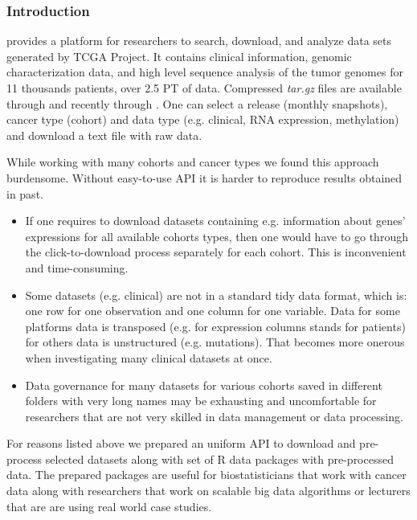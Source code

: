 \documentclass{bioinfo}
\begin{document}
\subsubsection*{Introduction}
\cite{TCGAP} provides a platform for researchers to search, download, and analyze data sets generated by TCGA Project. It contains clinical information, genomic characterization data, and high level sequence analysis of the tumor genomes for 11 thousands patients, over 2.5 PT of data. Compressed \textit{tar.gz} files are available through \cite{BroadGDAC} and recently through \cite{GDC}. One can select a release (monthly snapshots), cancer type (cohort) and data type (e.g. clinical, RNA expression, methylation) and download a text file with raw data. 

While working with many cohorts and cancer types we found this approach burdensome. Without easy-to-use API it is harder to reproduce results obtained in past.
\begin{itemize}
\item If one requires to download datasets containing e.g. information about genes' expressions for all available cohorts types, then one would have to go through the click-to-download process separately for each cohort. This is inconvenient and time-consuming.
\item Some datasets (e.g. clinical) are not in a standard tidy data format, which is: one row for one observation and one column for one variable. Data for some platforms data is transposed (e.g. for expression columns stands for patients) for others data is unstructured (e.g. mutations). That becomes more onerous when investigating many clinical datasets at once.
\item Data governance for many datasets for various cohorts saved in different folders with very long names may be exhausting and uncomfortable for researchers that are not very skilled in data management or data processing.
\end{itemize}
For reasons listed above we prepared an uniform API to download and pre-process selected datasets along with set of R data packages with pre-processed data. 
The prepared packages are useful for biostatisticians that work with cancer data along with researchers that work on scalable big data algorithms or lecturers that are are using real world case studies.
\end{document}
